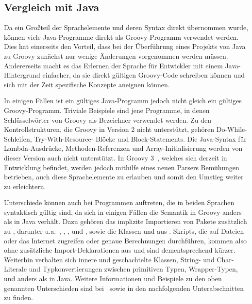 \documentclass[a4paper]{article}
\begin{document}
\subsection{Vergleich mit Java}\label{subsec:vergleichMitJava}

Da ein Großteil der Sprachelemente und deren Syntax direkt übernommen wurde, können viele Java-Programme direkt als Groovy-Programm verwendet werden.
Dies hat einerseits den Vorteil, dass bei der Überführung eines Projekts von Java zu Groovy zunächst nur wenige Änderungen vorgenommen werden müssen.
Andererseits macht es das Erlernen der Sprache für Entwickler mit einem Java-Hintergrund einfacher, da sie direkt gültigen Groovy-Code schreiben können und sich mit der Zeit spezifische Konzepte aneignen können.

In einigen Fällen ist ein gültiges Java-Programm jedoch nicht gleich ein gültiges Groovy-Programm.
Triviale Beispiele sind jene Programme, in denen Schlüsselwörter von Groovy als Bezeichner verwendet werden.
Zu den Kontrollstrukturen, die Groovy in Version 2 nicht unterstützt, gehören Do-While-Schleifen, Try-With-Resource- Blöcke und Block-Statements.
Die Java-Syntax für Lambda-Ausdrücke, Methoden-Referenzen und Array-Initialisierung werden von dieser Version auch nicht unterstützt.
In Groovy 3~\cite{groovy-lang:release3}, welches sich derzeit in Entwicklung befindet, werden jedoch mithilfe eines neuen Parsers Bemühungen betrieben, auch diese Sprachelemente zu erlauben und somit den Umstieg weiter zu erleichtern.

Unterschiede können auch bei Programmen auftreten, die in beiden Sprachen syntaktisch gültig sind, da sich in einigen Fällen die Semantik in Groovy anders als in Java verhält.
Dazu gehören das implizite Importieren von Pakete zusätzlich zu , darunter u.a.~, , ,  und , sowie die Klassen  und  aus .
Skripts, die auf Dateien oder das Internet zugreifen oder genaue Berechnungen durchführen, kommen also ohne zusätzliche Import-Deklarationen aus und sind dementsprechend kürzer.
Weiterhin verhalten sich innere und geschachtelte Klassen, String- und Char-Literale und Typkonvertierungen zwischen primitiven Typen, Wrapper-Typen,  und  anders als in Java.
Weitere Informationen und Beispiele zu den oben genannten Unterschieden sind bei~\cite{groovy-lang:differences} sowie in den nachfolgenden Unterabschnitten zu finden.
\end{document}
